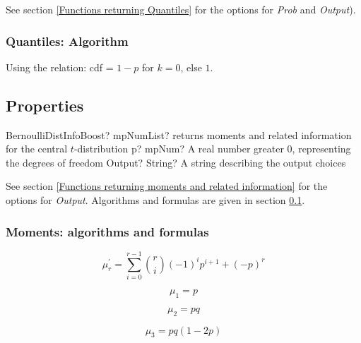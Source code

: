 See section \ref{Functions returning Quantiles} for the options for  {\itshape\sffamily Prob} and {\itshape\sffamily Output}). 

\subsubsection{Quantiles: Algorithm}
Using the relation: cdf = $1 - p$ for $k = 0$, else $1$.


\subsection{Properties}
\label{BernoulliDistributionProperties}


\begin{mpFunctionsExtract}
	\mpFunctionTwo
	{BernoulliDistInfoBoost? mpNumList? returns moments and related information for the central $t$-distribution}
	{p? mpNum? A real number greater 0, representing the degrees of freedom}
	{Output? String? A string describing the output choices}
\end{mpFunctionsExtract}

\vspace{0.3cm}

See section \ref{Functions returning moments and related information} for the options for {\itshape\sffamily Output}. Algorithms and formulas are given in section \ref{BernoulliDistributionProperties}.



\subsubsection{Moments: algorithms and formulas}

\begin{equation} 
	\mu_r^{'} = \sum_{i=0}^{r-1} \binom{r}{i}  (-1)^i p^{i+1} + (-p)^r
\end{equation}

\begin{equation} 
	\mu_1 = p
\end{equation}

\begin{equation} 
	\mu_2 = pq
\end{equation}

\begin{equation} 
	\mu_3 = pq(1-2p)
\end{equation}

